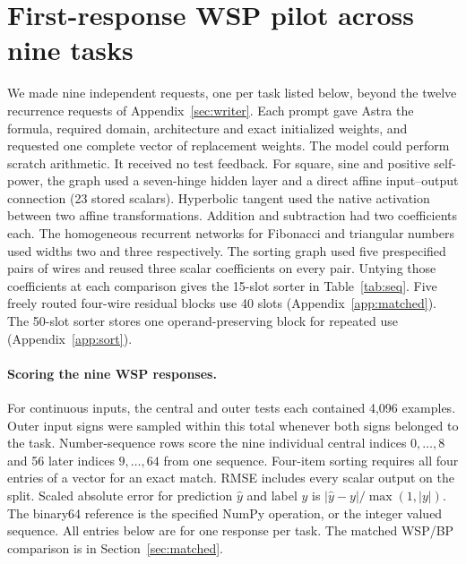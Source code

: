 \section{First-response WSP pilot across nine tasks}\label{app:literal}
We made nine independent requests, one per task listed below, beyond the twelve recurrence requests of Appendix~\ref{sec:writer}. Each prompt gave Astra the formula, required domain, architecture and exact initialized weights, and requested one complete vector of replacement weights. The model could perform scratch arithmetic. It received no test feedback. For square, sine and positive self-power, the graph used a seven-hinge hidden layer and a direct affine input--output connection (23 stored scalars). Hyperbolic tangent used the native activation between two affine transformations. Addition and subtraction had two coefficients each. The homogeneous recurrent networks for Fibonacci and triangular numbers used widths two and three respectively. The sorting graph used five prespecified pairs of wires and reused three scalar coefficients on every pair. Untying those coefficients at each comparison gives the 15-slot sorter in Table~\ref{tab:seq}. Five freely routed four-wire residual blocks use 40 slots (Appendix~\ref{app:matched}). The 50-slot sorter stores one operand-preserving block for repeated use (Appendix~\ref{app:sort}).

\paragraph{Scoring the nine WSP responses.}
For continuous inputs, the central and outer tests each contained 4,096 examples. Outer input signs were sampled within this total whenever both signs belonged to the task. Number-sequence rows score the nine individual central indices \(0,\ldots,8\) and 56 later indices \(9,\ldots,64\) from one sequence. Four-item sorting requires all four entries of a vector for an exact match. RMSE includes every scalar output on the split. Scaled absolute error for prediction \(\hat y\) and label \(y\) is \(|\hat y-y|/\max(1,|y|)\). The binary64 reference is the specified NumPy operation, or the integer valued sequence. All entries below are for one response per task. The matched WSP/BP comparison is in Section~\ref{sec:matched}.

